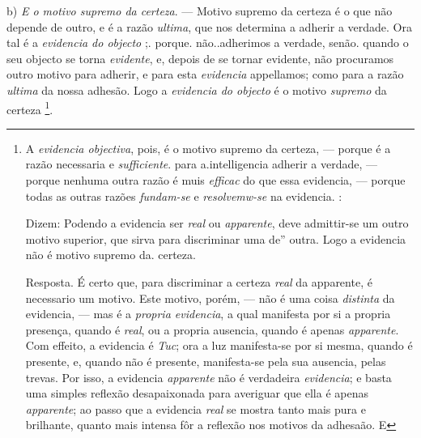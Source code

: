 b) \emph{E o motivo supremo da certeza}. --- Motivo supremo da certeza é o que não depende de outro, e é a razão \emph{ultima}, que nos determina a adherir a verdade. Ora tal é a \emph{evidencia do objecto} ;. porque. não..adherimos a verdade, senão. quando o seu objecto se torna \emph{evidente}, e, depois de se tornar evidente, não procuramos outro motivo para adherir, e para esta \emph{evidencia} appellamos; como para a razão \emph{ultima} da nossa adhesão. Logo a \emph{evidencia do objecto} é o motivo \emph{supremo} da certeza \footnote{A \emph{evidencia objectiva}, pois, é o motivo supremo da certeza, --- porque é a razão necessaria e \emph{sufficiente}. para a.intelligencia adherir a verdade, --- porque nenhuma outra razão é muis \emph{efficac} do que essa evidencia, --- porque todas as outras razões \emph{fundam-se} e \emph{resolvemw-se} na evidencia. :\par Dizem: Podendo a evidencia ser \emph{real} ou \emph{apparente}, deve admittir-se um outro motivo superior, que sirva para discriminar uma de” outra. Logo a evidencia não é motivo supremo da. certeza.\par Resposta. É certo que, para discriminar a certeza \emph{real} da apparente, é necessario um motivo. Este motivo, porém, --- não é uma coisa \emph{distinta} da evidencia, --- mas é a \emph{propria evidencia}, a qual manifesta por si a propria presença, quando é \emph{real}, ou a propria ausencia, quando é apenas \emph{apparente}. Com effeito, a evidencia é \emph{Tuc}; ora a luz manifesta-se por si mesma, quando é presente, e, quando não é presente, manifesta-se pela sua ausencia, pelas trevas. Por isso, a evidencia \emph{apparente} não é verdadeira \emph{evidencia}; e basta uma simples reflexão desapaixonada para averiguar que ella é apenas \emph{apparente}; ao passo que a evidencia \emph{real} se mostra tanto mais pura e brilhante, quanto mais intensa fôr a reflexão nos motivos da adhesaão. E}. \textbar{}


